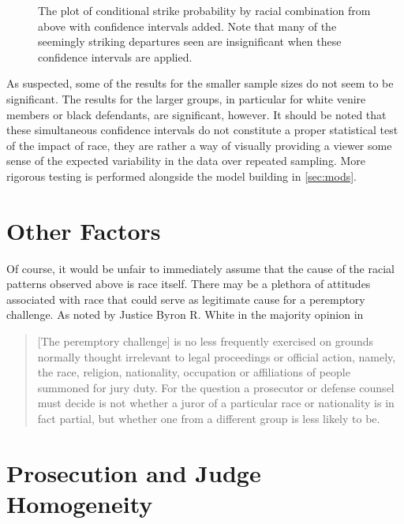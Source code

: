 \begin{figure}[!h]
  \centering
  \caption[Racial Combination and Strikes with Confidence Intervals]{The plot of conditional strike probability by racial
    combination from above with confidence intervals added. Note that many of the seemingly striking departures seen are
    insignificant when these confidence intervals are applied.}
  \label{fig:racedefci}
\end{figure}

As suspected, some of the results for the smaller sample sizes do not seem to be significant. The results for the larger groups,
in particular for white venire members or black defendants, are significant, however. It should be noted that these simultaneous
confidence intervals do not constitute a proper statistical test of the impact of race, they are rather a way of visually
providing a viewer some sense of the expected variability in the data over repeated sampling. More rigorous testing is performed
alongside the model building in \ref{sec:mods}.

\section{Other Factors} \label{sec:otherfact}

Of course, it would be unfair to immediately assume that the cause of the racial patterns observed above is race itself. There
may be a plethora of attitudes associated with race that could serve as legitimate cause for a peremptory challenge. As noted by 
Justice Byron R. White in the majority opinion in \cite{swainvalabama}

\begin{quote}
  [The peremptory challenge] is no less frequently exercised on grounds normally thought irrelevant to legal proceedings or
  official action, namely, the race, religion, nationality, occupation or affiliations of people summoned for jury duty. For the
  question a prosecutor or defense counsel must decide is not whether a juror of a particular race or nationality is in fact
  partial, but whether one from a different group is less likely to be.
\end{quote}

\section{Prosecution and Judge Homogeneity} \label{sec:causepro}

